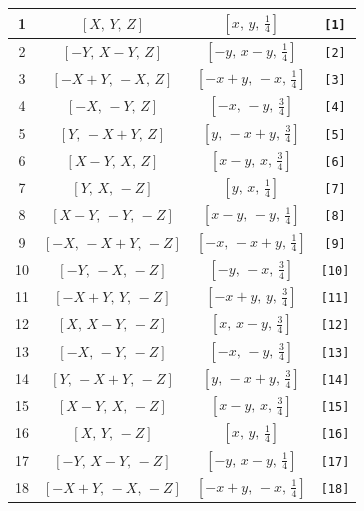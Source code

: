 \documentclass[fleqn,8pt]{jsarticle}
\begin{document}
\begin{longtable}{cccc}
1 & $\left[ X,\, Y,\, Z \right]$ & $\left[ x,\, y,\, \frac{1}{4} \right]$ & {\tt [1]} \\ \hline
2 & $\left[ - Y,\, X - Y,\, Z \right]$ & $\left[ - y,\, x - y,\, \frac{1}{4} \right]$ & {\tt [2]} \\ \hline
3 & $\left[ - X + Y,\, - X,\, Z \right]$ & $\left[ - x + y,\, - x,\, \frac{1}{4} \right]$ & {\tt [3]} \\ \hline
4 & $\left[ - X,\, - Y,\, Z \right]$ & $\left[ - x,\, - y,\, \frac{3}{4} \right]$ & {\tt [4]} \\ \hline
5 & $\left[ Y,\, - X + Y,\, Z \right]$ & $\left[ y,\, - x + y,\, \frac{3}{4} \right]$ & {\tt [5]} \\ \hline
6 & $\left[ X - Y,\, X,\, Z \right]$ & $\left[ x - y,\, x,\, \frac{3}{4} \right]$ & {\tt [6]} \\ \hline
7 & $\left[ Y,\, X,\, - Z \right]$ & $\left[ y,\, x,\, \frac{1}{4} \right]$ & {\tt [7]} \\ \hline
8 & $\left[ X - Y,\, - Y,\, - Z \right]$ & $\left[ x - y,\, - y,\, \frac{1}{4} \right]$ & {\tt [8]} \\ \hline
9 & $\left[ - X,\, - X + Y,\, - Z \right]$ & $\left[ - x,\, - x + y,\, \frac{1}{4} \right]$ & {\tt [9]} \\ \hline
10 & $\left[ - Y,\, - X,\, - Z \right]$ & $\left[ - y,\, - x,\, \frac{3}{4} \right]$ & {\tt [10]} \\ \hline
11 & $\left[ - X + Y,\, Y,\, - Z \right]$ & $\left[ - x + y,\, y,\, \frac{3}{4} \right]$ & {\tt [11]} \\ \hline
12 & $\left[ X,\, X - Y,\, - Z \right]$ & $\left[ x,\, x - y,\, \frac{3}{4} \right]$ & {\tt [12]} \\ \hline
13 & $\left[ - X,\, - Y,\, - Z \right]$ & $\left[ - x,\, - y,\, \frac{3}{4} \right]$ & {\tt [13]} \\ \hline
14 & $\left[ Y,\, - X + Y,\, - Z \right]$ & $\left[ y,\, - x + y,\, \frac{3}{4} \right]$ & {\tt [14]} \\ \hline
15 & $\left[ X - Y,\, X,\, - Z \right]$ & $\left[ x - y,\, x,\, \frac{3}{4} \right]$ & {\tt [15]} \\ \hline
16 & $\left[ X,\, Y,\, - Z \right]$ & $\left[ x,\, y,\, \frac{1}{4} \right]$ & {\tt [16]} \\ \hline
17 & $\left[ - Y,\, X - Y,\, - Z \right]$ & $\left[ - y,\, x - y,\, \frac{1}{4} \right]$ & {\tt [17]} \\ \hline
18 & $\left[ - X + Y,\, - X,\, - Z \right]$ & $\left[ - x + y,\, - x,\, \frac{1}{4} \right]$ & {\tt [18]} \\ \hline

\end{longtable}
\end{document}
